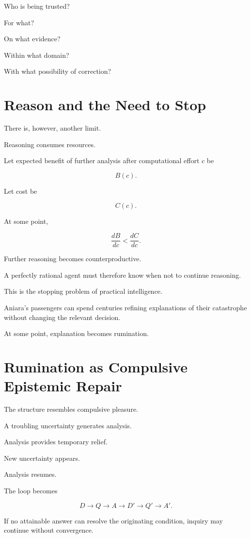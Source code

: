 \documentclass[11pt,oneside]{book}
\theoremstyle{definition}
\theoremstyle{remark}
\begin{document}
Who is being trusted?

For what?

On what evidence?

Within what domain?

With what possibility of correction?

\section{Reason and the Need to Stop}

There is, however, another limit.

Reasoning consumes resources.

Let expected benefit of further analysis after computational effort \(c\) be

\[
B(c).
\]

Let cost be

\[
C(c).
\]

At some point,

\[
\frac{dB}{dc}
<
\frac{dC}{dc}.
\]

Further reasoning becomes counterproductive.

A perfectly rational agent must therefore know when not to continue reasoning.

This is the stopping problem of practical intelligence.

Aniara's passengers can spend centuries refining explanations of their catastrophe without changing the relevant decision.

At some point, explanation becomes rumination.

\section{Rumination as Compulsive Epistemic Repair}

The structure resembles compulsive pleasure.

A troubling uncertainty generates analysis.

Analysis provides temporary relief.

New uncertainty appears.

Analysis resumes.

The loop becomes

\[
D
\rightarrow
Q
\rightarrow
A
\rightarrow
D'
\rightarrow
Q'
\rightarrow
A'.
\]

If no attainable answer can resolve the originating condition, inquiry may continue without convergence.
\end{document}
